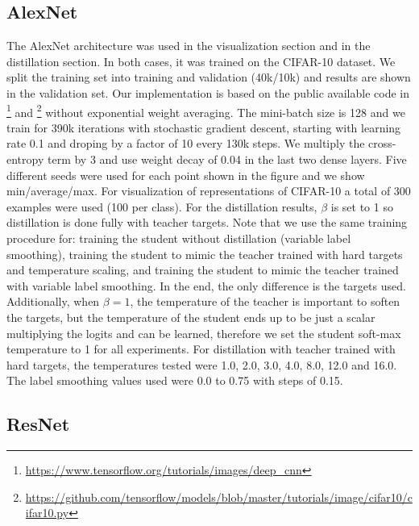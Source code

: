 \documentclass{article}
\begin{document}
\subsection{AlexNet}

The AlexNet architecture was used in the visualization section and in the distillation section. In both cases, it was trained on the CIFAR-10 dataset. We split the training set into training and validation (40k/10k) and results are shown in the validation set. Our implementation is based on the public available code in \footnote{\scriptsize\url{https://www.tensorflow.org/tutorials/images/deep_cnn}} and \footnote{\scriptsize\url{https://github.com/tensorflow/models/blob/master/tutorials/image/cifar10/cifar10.py}} without exponential weight averaging. The mini-batch size is 128 and we train for 390k iterations with stochastic gradient descent, starting with learning rate 0.1 and droping by a factor of 10 every 130k steps. We multiply the cross-entropy term by 3 and use weight decay of 0.04 in the last two dense layers. Five different seeds were used for each point shown in the figure and we show min/average/max. For visualization of representations of CIFAR-10 a total of 300 examples were used (100 per class).  For the distillation results, $\beta$ is set to 1 so distillation is done fully with teacher targets. Note that we use the same training procedure for: training the student without distillation (variable label smoothing), training the student to mimic the teacher trained with hard targets and temperature scaling, and training the student to mimic the teacher trained with variable label smoothing. In the end, the only difference is the targets used. Additionally, when $\beta = 1$, the temperature of the teacher is important to soften the targets, but the temperature of the student ends up to be just a scalar multiplying the logits and can be learned, therefore we set the student soft-max temperature to 1 for all experiments. For distillation with teacher trained with hard targets, the temperatures tested were 1.0, 2.0, 3.0, 4.0, 8.0, 12.0 and 16.0. The label smoothing values used were 0.0 to 0.75 with steps of 0.15. 

\subsection{ResNet}
\end{document}
